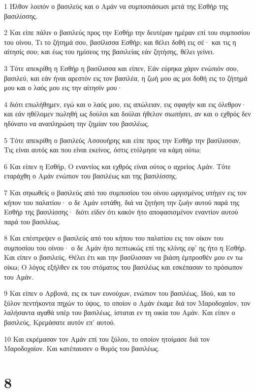\par 1 Ήλθον λοιπόν ο βασιλεύς και ο Αμάν να συμποσιάσωσι μετά της Εσθήρ της βασιλίσσης.
\par 2 Και είπε πάλιν ο βασιλεύς προς την Εσθήρ την δευτέραν ημέραν επί του συμποσίου του οίνου, Τι το ζήτημά σου, βασίλισσα Εσθήρ; και θέλει δοθή εις σέ· και τις η αίτησίς σου; και έως του ημίσεος της βασιλείας εάν ζητήσης, θέλει γείνει.
\par 3 Τότε απεκρίθη η Εσθήρ η βασίλισσα και είπεν, Εάν εύρηκα χάριν ενώπιόν σου, βασιλεύ, και εάν ήναι αρεστόν εις τον βασιλέα, η ζωή μου ας μοι δοθή εις το ζήτημά μου και ο λαός μου εις την αίτησίν μου·
\par 4 διότι επωλήθημεν, εγώ και ο λαός μου, εις απώλειαν, εις σφαγήν και εις όλεθρον· και εάν ηθέλομεν πωληθή ως δούλοι και δούλαι ήθελον σιωπήσει, αν και ο εχθρός δεν ηδύνατο να αναπληρώση την ζημίαν του βασιλέως.
\par 5 Τότε απεκρίθη ο βασιλεύς Ασσουήρης και είπε προς την Εσθήρ την βασίλισσαν, Τις είναι αυτός και που είναι εκείνος, όστις ετόλμησε να κάμη ούτω;
\par 6 Και είπεν η Εσθήρ, Ο εναντίος και εχθρός είναι ούτος ο αχρείος Αμάν. Τότε εταράχθη ο Αμάν ενώπιον του βασιλέως και της βασιλίσσης.
\par 7 Και σηκωθείς ο βασιλεύς από του συμποσίου του οίνου ωργισμένος υπήγεν εις τον κήπον του παλατίου· ο δε Αμάν εστάθη, διά να ζητήση την ζωήν αυτού παρά της Εσθήρ της βασιλίσσης· διότι είδεν ότι κακόν ήτο αποφασισμένον εναντίον αυτού παρά του βασιλέως.
\par 8 Και επέστρεψεν ο βασιλεύς από του κήπου του παλατίου εις τον οίκον του συμποσίου του οίνου· ο δε Αμάν ήτο πεπτωκώς επί της κλίνης εφ' ης ήτο η Εσθήρ. Και είπεν ο βασιλεύς, Θέλει έτι και την βασίλισσαν να βιάση έμπροσθέν μου εν τω οίκω; Ο λόγος εξήλθεν εκ του στόματος του βασιλέως και εσκέπασαν το πρόσωπον του Αμάν.
\par 9 Και είπεν ο Αρβονά, εις εκ των ευνούχων, ενώπιον του βασιλέως, Ιδού, και το ξύλον πεντήκοντα πηχών το ύψος, το οποίον ο Αμάν έκαμε διά τον Μαροδοχαίον, τον λαλήσαντα αγαθά υπέρ του βασιλέως, ίσταται εν τη οικία του Αμάν. Και είπεν ο βασιλεύς, Κρεμάσατε αυτόν επ' αυτού.
\par 10 Και εκρέμασαν τον Αμάν επί του ξύλου, το οποίον ητοίμασε διά τον Μαροδοχαίον. Και κατέπαυσεν ο θυμός του βασιλέως.

\chapter{8}

